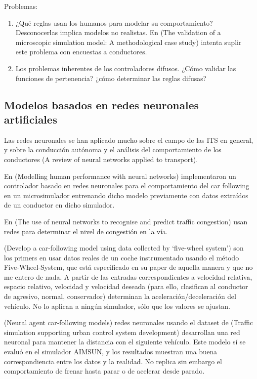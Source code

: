 Problemas:

\begin{enumerate}
	\item ¿Qué reglas usan los humanos para modelar su comportamiento? Desconocerlas implica modelos no realistas. En (The validation of a microscopic simulation model: A methodological case study) intenta suplir este problema con encuestas a conductores.
	\item Los problemas inherentes de los controladores difusos. ¿Cómo validar las funciones de pertenencia? ¿cómo determinar las reglas difusas?
\end{enumerate}

\subsection{Modelos basados en redes neuronales artificiales}

Las redes neuronales se han aplicado mucho sobre el campo de las ITS en general, y sobre la conducción autónoma y el análisis del comportamiento de los conductores (A review of neural networks applied to transport).

En (Modelling human performance with neural networks) implementaron un controlador basado en redes neuronales para el comportamiento del car following en un microsimulador entrenando dicho modelo previamente con datos extraídos de un conductor en dicho simulador.

En (The  use  of  neural  networks  to  recognise  and
predict traffic congestion) usan redes para determinar el nivel de congestión en la vía.

(Develop a car-following model using data collected by ‘five-wheel
system’) son los primers en usar datos reales de un coche instrumentado usando el método Five-Wheel-System, que está especificado en su paper de aquella manera y que no me entero de nada. A partir de las entradas correspondientes a velocidad relativa, espacio relativo, velocidad y velocidad deseada (para ello, clasifican al conductor de agresivo, normal, conservador) determinan la aceleración/deceleración del vehículo. No lo aplican a ningún simulador, sólo que los valores se ajustan.

(Neural agent car-following models) redes neuronales usando el dataset de (Traffic simulation supporting urban control system development) desarrollan una red neuronal para mantener la distancia con el siguiente vehículo. Este modelo sí se evaluó en el simulador AIMSUN, y los resultados muestran una buena correspondiencia entre los datos y la realidad. No replica sin embargo el comportamiento de frenar hasta parar o de acelerar desde parado.

